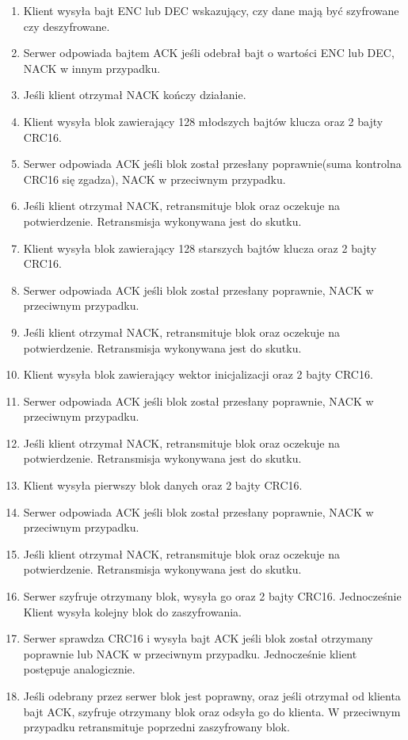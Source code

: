\begin{enumerate}[noitemsep]
\item Klient wysyła bajt ENC lub DEC wskazujący, czy dane mają być szyfrowane czy deszyfrowane.
\item Serwer odpowiada bajtem ACK jeśli odebrał bajt o wartości ENC lub DEC, NACK w innym przypadku.
\item Jeśli klient otrzymał NACK kończy działanie.
\item Klient wysyła blok zawierający 128 młodszych bajtów klucza oraz 2 bajty CRC16.
\item Serwer odpowiada ACK jeśli blok został przesłany poprawnie(suma kontrolna CRC16 się zgadza), NACK w przeciwnym przypadku.
\item Jeśli klient otrzymał NACK, retransmituje blok oraz oczekuje na potwierdzenie. Retransmisja wykonywana jest do skutku.
\item Klient wysyła blok zawierający 128 starszych bajtów klucza oraz 2 bajty CRC16.
\item Serwer odpowiada ACK jeśli blok został przesłany poprawnie, NACK w przeciwnym przypadku.
\item Jeśli klient otrzymał NACK, retransmituje blok oraz oczekuje na potwierdzenie. Retransmisja wykonywana jest do skutku.
\item Klient wysyła blok zawierający wektor inicjalizacji oraz 2 bajty CRC16.
\item Serwer odpowiada ACK jeśli blok został przesłany poprawnie, NACK w przeciwnym przypadku.
\item Jeśli klient otrzymał NACK, retransmituje blok oraz oczekuje na potwierdzenie. Retransmisja wykonywana jest do skutku.
\item Klient wysyła pierwszy blok danych oraz 2 bajty CRC16.
\item Serwer odpowiada ACK jeśli blok został przesłany poprawnie, NACK w przeciwnym przypadku.
\item Jeśli klient otrzymał NACK, retransmituje blok oraz oczekuje na potwierdzenie. Retransmisja wykonywana jest do skutku.
\item Serwer szyfruje otrzymany blok, wysyła go oraz 2 bajty CRC16. Jednocześnie Klient wysyła kolejny blok do zaszyfrowania.
\item Serwer sprawdza CRC16 i wysyła bajt ACK jeśli blok został otrzymany poprawnie lub NACK w przeciwnym przypadku. Jednocześnie klient postępuje analogicznie.
\item Jeśli odebrany przez serwer blok jest poprawny, oraz jeśli otrzymał od klienta bajt ACK, szyfruje otrzymany blok oraz odsyła go do klienta. W przeciwnym przypadku retransmituje poprzedni zaszyfrowany blok.

\end{enumerate}
